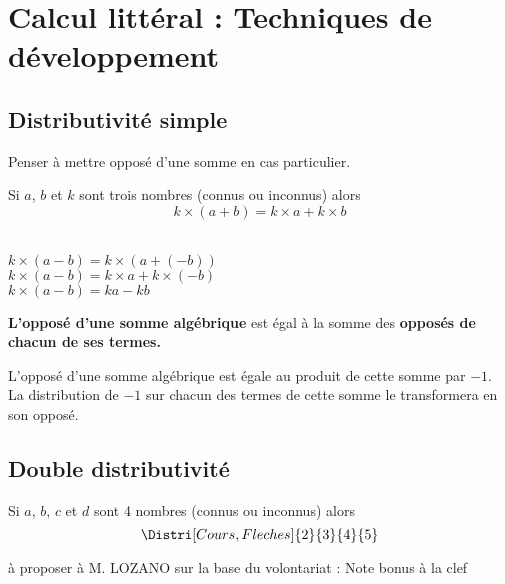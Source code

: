\section{Calcul littéral : Techniques de développement}
\subsection{Distributivité simple}

Penser à mettre opposé d'une somme en cas particulier.
\begin{propriete}[\admise]
    Si $a$, $b$ et $k$ sont trois nombres (connus ou inconnus) alors$$k\times(a+b)=k\times a+k\times b$$
\end{propriete}

\begin{remarque}
    \phantom{rrr}\\
    $k\times(a-b)=k\times(a+(-b))$\\
    $k\times(a-b)=k\times a+k\times (-b)$\\
    $k\times(a-b)=ka-kb$
\end{remarque}

\begin{propriete}
    {\bfseries L'opposé d'une somme algébrique} est égal à la somme des {\bfseries opposés de chacun de ses termes.}
\end{propriete}

\begin{preuve}
    L'opposé d'une somme algébrique est égale au produit de cette somme par $-1$.\\
    La distribution de $-1$ sur chacun des termes de cette somme le transformera en son opposé.
\end{preuve}

\subsection{Double distributivité}
\begin{propriete}[\admise]
    Si $a$, $b$, $c$ et $d$ sont 4 nombres (connus ou inconnus) alors $$ \Distri[Cours,Fleches]{2}{3}{4}{5}$$ 
\end{propriete}

\begin{preuve}
    à proposer à M. LOZANO sur la base du volontariat : Note bonus à la clef 
\end{preuve}

